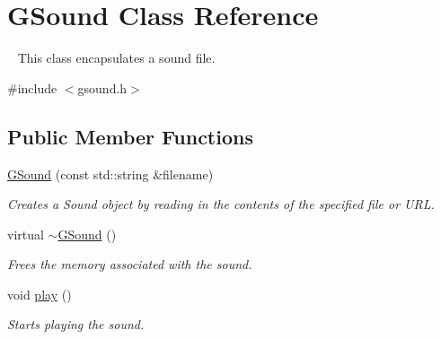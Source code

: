 \hypertarget{classsgl_1_1GSound}{}\section{G\+Sound Class Reference}
\label{classsgl_1_1GSound}


~\newline
 This class encapsulates a sound file.  




{\ttfamily \#include $<$gsound.\+h$>$}

\subsection*{Public Member Functions}
\begin{DoxyCompactItemize}
\item 
\mbox{\hyperlink{classsgl_1_1GSound_a981dcd44480101dbeb769d9fb93ef9b2}{G\+Sound}} (const std\+::string \&filename)
\begin{DoxyCompactList}\small\item\em Creates a {\ttfamily Sound} object by reading in the contents of the specified file or U\+RL. \end{DoxyCompactList}\item 
virtual \mbox{\hyperlink{classsgl_1_1GSound_a417fb21fbcfa4b731a58854dd4005da7}{$\sim$\+G\+Sound}} ()
\begin{DoxyCompactList}\small\item\em Frees the memory associated with the sound. \end{DoxyCompactList}\item 
void \mbox{\hyperlink{classsgl_1_1GSound_a6d58098c6cf63c241ed03bc797256bb1}{play}} ()
\begin{DoxyCompactList}\small\item\em Starts playing the sound. \end{DoxyCompactList}\end{DoxyCompactItemize}
